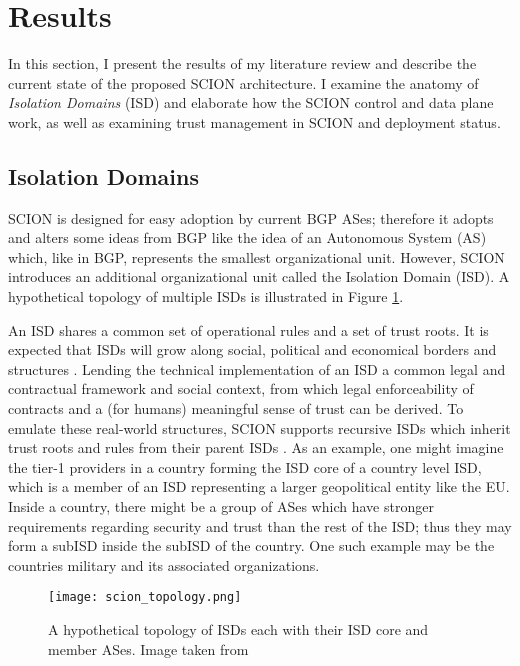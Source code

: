\documentclass[../eva1_scion.tex]{subfiles}
\begin{document}
\section{Results} \label{sec:results}
    In this section, I present the results of my literature review and describe the current state of the proposed SCION architecture. I examine the anatomy of \textit{Isolation Domains} (ISD) and elaborate how the SCION control and data plane work, as well as examining trust management in SCION and deployment status.

    \subsection{Isolation Domains} \label{ssec:isd}
    SCION is designed for easy adoption by current BGP ASes; therefore it adopts and alters some ideas from BGP like the idea of an Autonomous System (AS) which, like in BGP, represents the smallest organizational unit. However, SCION introduces an additional organizational unit called the Isolation Domain (ISD). A hypothetical topology of multiple ISDs is illustrated in Figure \ref{fig:isd_topology}.

    An ISD shares a common set of operational rules and a set of trust roots. It is expected that ISDs will grow along social, political and economical borders and structures \cite{scion_2011}. Lending the technical implementation of an ISD a common legal and contractual framework and social context, from which legal enforceability of contracts and a (for humans) meaningful sense of trust can be derived. To emulate these real-world structures, SCION supports recursive ISDs  which inherit trust roots and rules from their parent ISDs \cite{scion_2011}. As an example, one might imagine the tier-1 providers in a country forming the ISD core of a country level ISD, which is a member of an ISD representing a larger geopolitical entity like the EU. Inside a country, there might be a group of ASes which have stronger requirements regarding security and trust than the rest of the ISD; thus they may form a subISD inside the subISD of the country. One such example may be the countries military and its associated organizations.

    \begin{figure}[ht]
        \centering
        \texttt{[image: scion\_topology.png]}
        \caption{A hypothetical topology of ISDs each with their ISD core and member ASes. Image taken from \cite{scion_2015}}%
        \label{fig:isd_topology}
    \end{figure}
\end{document}
